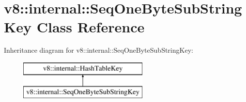 \hypertarget{classv8_1_1internal_1_1_seq_one_byte_sub_string_key}{}\section{v8\+:\+:internal\+:\+:Seq\+One\+Byte\+Sub\+String\+Key Class Reference}
\label{classv8_1_1internal_1_1_seq_one_byte_sub_string_key}
Inheritance diagram for v8\+:\+:internal\+:\+:Seq\+One\+Byte\+Sub\+String\+Key\+:\begin{figure}[H]
\begin{center}
\leavevmode
\includegraphics[height=2.000000cm]{classv8_1_1internal_1_1_seq_one_byte_sub_string_key}
\end{center}
\end{figure}
